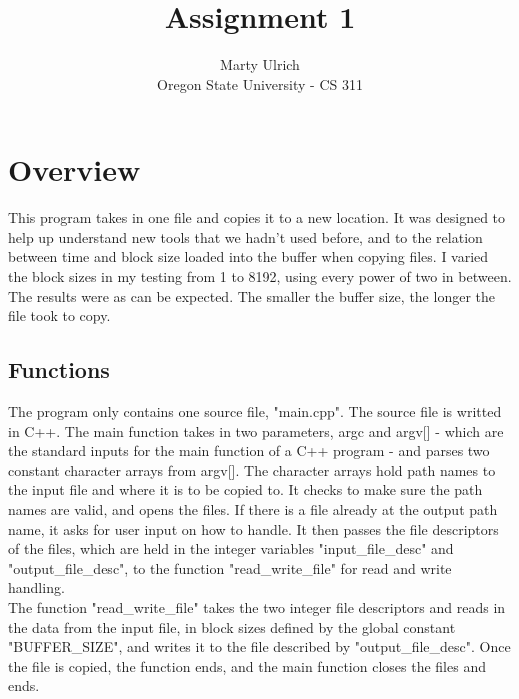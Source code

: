 \documentclass[letterpaper,10pt,onecolumn,titlepage]{article}
\begin{document}
\title{Assignment 1}
\author{Marty Ulrich\\
Oregon State University - CS 311}
\renewcommand{\today}{January 24, 2012}
\maketitle

\section {Overview}
This program takes in one file and copies it to a new location.  It was designed to help up understand new tools that we hadn't used before, and to the relation between time and block size loaded into the buffer when copying files.  I varied the block sizes in my testing from 1 to 8192, using every power of two in between.  The results were as can be expected.  The smaller the buffer size, the longer the file took to copy.

	\subsection {Functions}
	The program only contains one source file, "main.cpp".  The source file is writted in C++.  The main function takes in two parameters, argc and argv[] - which are the standard inputs for the main function of a C++ program - and parses two constant character arrays from argv[].  The character arrays hold path names to the input file and where it is to be copied to.  It checks to make sure the path names are valid, and opens the files.  If there is a file already at the output path name, it asks for user input on how to handle.  It then passes the file descriptors of the files, which are held in the integer variables "input\_file\_desc" and "output\_file\_desc", to the function "read\_write\_file" for read and write handling.
	\\
	The function "read\_write\_file" takes the two integer file descriptors and reads in the data from the input file, in block sizes defined by the global constant "BUFFER\_SIZE", and writes it to the file described by "output\_file\_desc".  Once the file is copied, the function ends, and the main function closes the files and ends.
\end{document}
